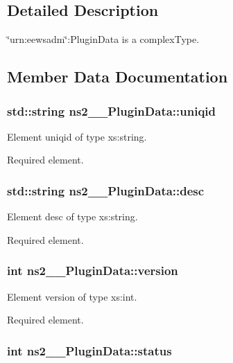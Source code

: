 \subsection{Detailed Description}
\char`\"{}urn:eewsadm\char`\"{}:PluginData is a complexType. 

\subsection{Member Data Documentation}
\subsubsection{\setlength{\rightskip}{0pt plus 5cm}std::string {\bf ns2\_\-\_\-PluginData::uniqid}}\label{classns2____PluginData_ee4b448721cd13b338ed888c17beb55c}


Element uniqid of type xs:string. 

Required element. 
\subsubsection{\setlength{\rightskip}{0pt plus 5cm}std::string {\bf ns2\_\-\_\-PluginData::desc}}\label{classns2____PluginData_b7cd83e7b551cae3f4880265ddd47d6b}


Element desc of type xs:string. 

Required element. 
\subsubsection{\setlength{\rightskip}{0pt plus 5cm}int {\bf ns2\_\-\_\-PluginData::version}}\label{classns2____PluginData_2fd51ec8f8e1b1a4115c873123655e89}


Element version of type xs:int. 

Required element. 
\subsubsection{\setlength{\rightskip}{0pt plus 5cm}int {\bf ns2\_\-\_\-PluginData::status}}\label{classns2____PluginData_0bfbadb8a05267ee629c4815c4dbea1e}


